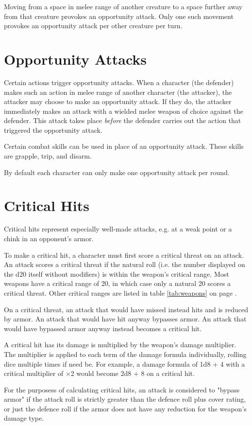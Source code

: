 \begin{multicols*}{2}
    Moving from a space in melee range of another creature to a space further
    away from that creature provokes an opportunity attack. Only one such
    movement provokes an opportunity attack per other creature per turn.

    \section{Opportunity Attacks}\label{combat:opportunity-attacks}
    Certain actions trigger opportunity attacks. When a character (the
    defender) makes such an action in melee range of another character (the
    attacker), the attacker may choose to make an opportunity attack. If they
    do, the attacker immediately makes an attack with a wielded melee weapon
    of choice against the defender. This attack takes place \textit{before}
    the defender carries out the action that triggered the opportunity attack.

    Certain combat skills can be used in place of an opportunity attack. These
    skills are grapple, trip, and disarm.

    By default each character can only make one opportunity attack per round.

    \section{Critical Hits}\label{combat:critical-hits}
    Critical hits represent especially well-made attacks, e.g. at a weak point
    or a chink in an opponent's armor.

    To make a critical hit, a character must first score a critical threat on
    an attack. An attack scores a critical threat if the natural roll (i.e. the
    number displayed on the d20 itself without modifiers) is within the
    weapon's critical range. Most weapons have a critical range of 20, in which
    case only a natural 20 scores a critical threat. Other critical ranges are
    listed in table \ref{tab:weapons} on page \pageref{tab:weapons}.

    On a critical threat, an attack that would have missed instead hits
    and is reduced by armor. An attack that would have hit anyway bypasses
    armor. An attack that would have bypassed armor anyway instead becomes a
    critical hit.

    A critical hit has its damage is multiplied by the weapon's damage
    multiplier. The multiplier is applied to each term of the damage
    formula individually, rolling dice multiple times if need be. For example,
    a damage formula of 1d8 + 4 with a critical multiplier of $\times$2 would
    become 2d8 + 8 on a critical hit.

    For the purposess of calculating critical hits, an attack is
    considered to "bypass armor" if the attack roll is strictly greater than
    the defence roll plus cover rating, or just the defence roll if the armor
    does not have any reduction for the weapon's damage type.
\end{multicols*}
